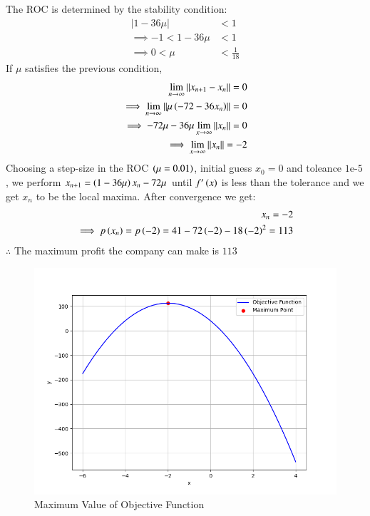 \documentclass[journal]{IEEEtran}
\begin{document}
The ROC is determined by the stability condition:
\begin{align}
    |1 - 36\mu| &< 1 \\
    \implies -1 < 1 - 36\mu &< 1 \\
    \implies 0 < \mu &< \frac{1}{18}
\end{align}
If $\mu$ satisfies the previous condition,
\begin{align}
    \lim_{n\rightarrow\infty}\left\lVert x_{n+1}-x_n\right\rVert=0\\
    \implies \lim_{n\rightarrow\infty}\left\lVert\mu\left(-72-36x_n\right)\right\rVert=0\\
    \implies -72\mu-36\mu\lim_{x\rightarrow\infty}\left\lVert x_n\right\rVert=0\\
    \implies \lim_{x\rightarrow\infty}\left\lVert x_n\right\rVert=-2
\end{align}
Choosing a step-size in the ROC $\left(\mu=0.01\right)$, initial guess $x_0=0$ and toleance $1\text{e-}5$, we perform $x_{n+1}=\left(1-36\mu\right)x_n-72\mu$ until $f^\prime\left(x\right)$ is less than the tolerance and we get $x_n$ to be the local maxima. After convergence we get:
\begin{align}
    x_n=-2\\
    \implies p\left(x_n\right)=p\left(-2\right)=41-72\left(-2\right)-18\left(-2\right)^2=113
\end{align}
$\therefore$ The maximum profit the company can make is $113$
\begin{figure}[h!]
   \centering
   \includegraphics[width=1\linewidth]{figs/fig.png}
   \caption{Maximum Value of Objective Function}
   \label{stemplot}
\end{figure}
\end{document}
